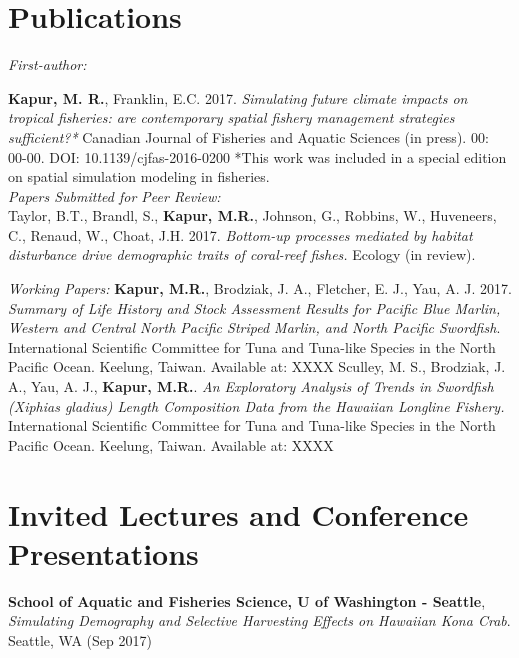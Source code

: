 \documentclass[10pt, letterpaper]{article}
\begin{document}
\section*{Publications}
\noindent \textit{First-author:}

\hangindent=0.5cm \noindent \textbf{Kapur, M. R.}, Franklin, E.C. 2017. \textit{Simulating future climate impacts on tropical fisheries: are contemporary spatial fishery management strategies sufficient?*} Canadian Journal of Fisheries and Aquatic Sciences (in press).  00: 00-00. DOI: 10.1139/cjfas-2016-0200 
*This work was included in a special edition on spatial simulation modeling in fisheries. \\

\noindent \textit{Papers Submitted for Peer Review:}\\
\hangindent=0.5cm \noindent Taylor, B.T., Brandl, S., \textbf{Kapur, M.R.},  Johnson, G., Robbins, W., Huveneers, C., Renaud, W., Choat, J.H. 2017.
\textit{Bottom-up processes mediated by habitat disturbance drive demographic traits of coral-reef fishes.} Ecology (in review).\newline

\noindent \textit{Working Papers:}\newline
\hangindent=0.5cm \noindent  \textbf{Kapur, M.R.},  Brodziak, J. A., Fletcher, E. J., Yau, A. J. 2017. \textit{Summary of Life History and Stock Assessment Results for Pacific Blue Marlin, Western and Central North Pacific Striped Marlin, and North Pacific Swordfish}. International Scientific Committee for Tuna and Tuna-like Species in the North Pacific Ocean. Keelung, Taiwan. Available at: XXXX \newline
\hangindent=0.5cm \noindent  Sculley, M. S., Brodziak, J. A., Yau, A. J., \textbf{Kapur, M.R.}.  \textit{An Exploratory Analysis of Trends in Swordfish (Xiphias gladius) Length Composition Data from the Hawaiian Longline Fishery.} International Scientific Committee for Tuna and Tuna-like Species in the North Pacific Ocean. Keelung, Taiwan. Available at: XXXX \\

\section*{Invited Lectures and Conference Presentations}

\noindent \textbf{School of Aquatic and Fisheries Science, U of Washington - Seattle}, \textit{Simulating Demography and Selective Harvesting Effects on Hawaiian Kona Crab}. Seattle, WA (Sep 2017)
\end{document}
